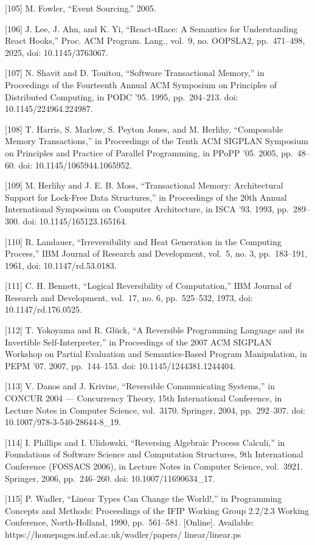 \documentclass[
  10
]{article}
\begin{document}
{[}105{]} M. Fowler, ``Event Sourcing.'' 2005.

{[}106{]} J. Lee, J. Ahn, and K. Yi, ``React-tRace: A Semantics for
Understanding React Hooks,'' Proc. ACM Program. Lang., vol.~9, no.
OOPSLA2, pp.~471--498, 2025, doi: 10.1145/3763067.

{[}107{]} N. Shavit and D. Touitou, ``Software Transactional Memory,''
in Proceedings of the Fourteenth Annual ACM Symposium on Principles of
Distributed Computing, in PODC '95. 1995, pp.~204--213. doi:
10.1145/224964.224987.

{[}108{]} T. Harris, S. Marlow, S. Peyton Jones, and M. Herlihy,
``Composable Memory Transactions,'' in Proceedings of the Tenth ACM
SIGPLAN Symposium on Principles and Practice of Parallel Programming, in
PPoPP '05. 2005, pp.~48--60. doi: 10.1145/1065944.1065952.

{[}109{]} M. Herlihy and J. E. B. Moss, ``Transactional Memory:
Architectural Support for Lock-Free Data Structures,'' in Proceedings of
the 20th Annual International Symposium on Computer Architecture, in
ISCA '93. 1993, pp.~289--300. doi: 10.1145/165123.165164.

{[}110{]} R. Landauer, ``Irreversibility and Heat Generation in the
Computing Process,'' IBM Journal of Research and Development, vol.~5,
no. 3, pp.~183--191, 1961, doi: 10.1147/rd.53.0183.

{[}111{]} C. H. Bennett, ``Logical Reversibility of Computation,'' IBM
Journal of Research and Development, vol.~17, no. 6, pp.~525--532, 1973,
doi: 10.1147/rd.176.0525.

{[}112{]} T. Yokoyama and R. Glück, ``A Reversible Programming Language
and its Invertible Self-Interpreter,'' in Proceedings of the 2007 ACM
SIGPLAN Workshop on Partial Evaluation and Semantics-Based Program
Manipulation, in PEPM '07. 2007, pp.~144--153. doi:
10.1145/1244381.1244404.

{[}113{]} V. Danos and J. Krivine, ``Reversible Communicating Systems,''
in CONCUR 2004 --- Concurrency Theory, 15th International Conference, in
Lecture Notes in Computer Science, vol.~3170. Springer, 2004,
pp.~292--307. doi: 10.1007/978-3-540-28644-8\_19.

{[}114{]} I. Phillips and I. Ulidowski, ``Reversing Algebraic Process
Calculi,'' in Foundations of Software Science and Computation
Structures, 9th International Conference (FOSSACS 2006), in Lecture
Notes in Computer Science, vol.~3921. Springer, 2006, pp.~246--260. doi:
10.1007/11690634\_17.

{[}115{]} P. Wadler, ``Linear Types Can Change the World!,'' in
Programming Concepts and Methods: Proceedings of the IFIP Working Group
2.2/2.3 Working Conference, North-Holland, 1990, pp.~561--581.
{[}Online{]}. Available: https://homepages.inf.ed.ac.uk/wadler/papers/
linear/linear.ps
\end{document}

